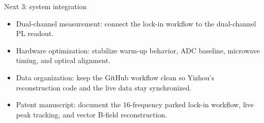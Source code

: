\documentclass[aspectratio=169,10pt]{beamer}
\newcommand{\smallitemsep}{\setlength{\itemsep}{0.45em}}
\begin{document}
\begin{frame}{Next 3: system integration}
\begin{itemize}\smallitemsep
  \item Dual-channel measurement: connect the lock-in workflow to the dual-channel PL readout.
  \item Hardware optimization: stabilize warm-up behavior, ADC baseline, microwave timing, and optical alignment.
  \item Data organization: keep the GitHub workflow clean so Yizhou's reconstruction code and the live data stay synchronized.
  \item Patent manuscript: document the 16-frequency parked lock-in workflow, live peak tracking, and vector B-field reconstruction.
\end{itemize}
\end{frame}
\end{document}
